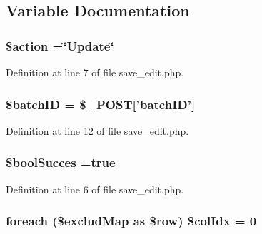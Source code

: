 \subsection{Variable Documentation}
\hypertarget{save__edit_8php_aa698a3e72116e8e778be0e95d908ee30}{
\subsubsection[{\$action}]{\setlength{\rightskip}{0pt plus 5cm}\$action =\char`\"{}Update\char`\"{}}}\label{save__edit_8php_aa698a3e72116e8e778be0e95d908ee30}


Definition at line 7 of file save\-\_\-edit.\-php.

\hypertarget{save__edit_8php_aaa6d122ea9cb55b210aadd86e5654a74}{
\subsubsection[{\$batch\-I\-D}]{\setlength{\rightskip}{0pt plus 5cm}\${\bf batch\-I\-D} = \$\-\_\-\-P\-O\-S\-T\mbox{[}'{\bf batch\-I\-D}'\mbox{]}}}\label{save__edit_8php_aaa6d122ea9cb55b210aadd86e5654a74}


Definition at line 12 of file save\-\_\-edit.\-php.

\hypertarget{save__edit_8php_a538eaf07e91a8c4f140bc04fa2b899cf}{
\subsubsection[{\$bool\-Succes}]{\setlength{\rightskip}{0pt plus 5cm}\$bool\-Succes ={\bf true}}}\label{save__edit_8php_a538eaf07e91a8c4f140bc04fa2b899cf}


Definition at line 6 of file save\-\_\-edit.\-php.

\hypertarget{save__edit_8php_a4deb48a7e93f5e779e135128a3d1ac1b}{
\subsubsection[{\$col\-Idx}]{\setlength{\rightskip}{0pt plus 5cm}foreach (\$exclud\-Map as \$row) \$col\-Idx = 0}}\label{save__edit_8php_a4deb48a7e93f5e779e135128a3d1ac1b}


